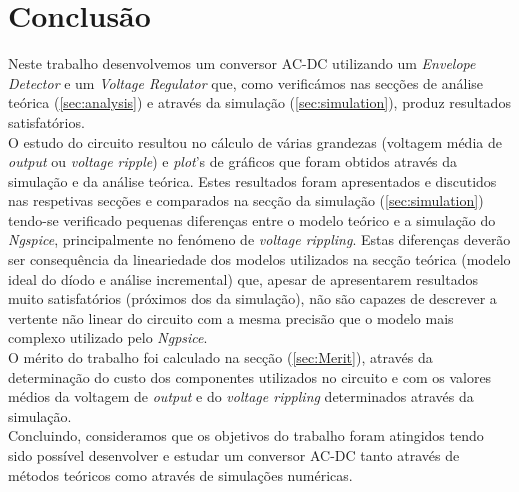 \section{Conclusão}
\label{sec:conclusion}

Neste trabalho desenvolvemos um conversor AC-DC utilizando um \emph{Envelope Detector} e um \emph{Voltage Regulator} que, como verificámos
nas secções de análise teórica (\ref{sec:analysis}) e através da simulação (\ref{sec:simulation}), produz resultados satisfatórios.
\\
O estudo do circuito resultou no cálculo de várias grandezas (voltagem média de \emph{output} ou \emph{voltage ripple}) e \emph{plot}'s de gráficos que foram
obtidos através da simulação e da análise teórica. Estes resultados foram apresentados e discutidos nas respetivas secções 
e comparados na secção da simulação (\ref{sec:simulation}) tendo-se verificado pequenas diferenças entre o modelo teórico e a simulação do \emph{Ngspice},
principalmente no fenómeno de \emph{voltage rippling}. 
Estas diferenças deverão ser consequência da lineariedade dos modelos utilizados na secção teórica (modelo ideal do díodo e análise incremental)
que, apesar de apresentarem resultados muito satisfatórios (próximos dos da simulação), não são capazes de descrever a vertente não
linear do circuito com a mesma precisão que o modelo mais complexo utilizado pelo \emph{Ngpsice}.
\\
O mérito do trabalho foi calculado na secção (\ref{sec:Merit}), através da determinação do custo dos componentes utilizados no circuito e com os
valores médios da voltagem de \emph{output} e do \emph{voltage rippling} determinados através da simulação.
\\
Concluindo, consideramos que os objetivos do trabalho foram atingidos tendo sido possível desenvolver e estudar um conversor AC-DC tanto através
de métodos teóricos como através de simulações numéricas.
